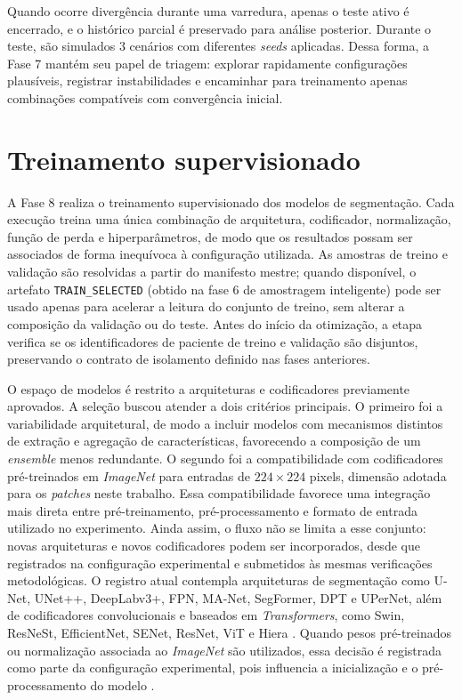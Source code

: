 Quando ocorre divergência durante uma varredura, apenas o teste ativo é encerrado, e o histórico parcial é preservado para análise posterior. Durante o teste, são simulados 3 cenários com diferentes \textit{seeds} aplicadas. Dessa forma, a Fase 7 mantém seu papel de triagem: explorar rapidamente configurações plausíveis, registrar instabilidades e encaminhar para treinamento apenas combinações compatíveis com convergência inicial.

\section{Treinamento supervisionado}\label{sec:met_treinamento}

A Fase 8 realiza o treinamento supervisionado dos modelos de segmentação. Cada
execução treina uma única combinação de arquitetura, codificador, normalização,
função de perda e hiperparâmetros, de modo que os resultados possam ser
associados de forma inequívoca à configuração utilizada. As amostras de treino e
validação são resolvidas a partir do manifesto mestre; quando disponível, o
artefato \texttt{TRAIN\_SELECTED} (obtido na fase 6 de amostragem inteligente)  pode ser usado apenas para acelerar a leitura
do conjunto de treino, sem alterar a composição da validação ou do teste. Antes
do início da otimização, a etapa verifica se os identificadores de paciente de
treino e validação são disjuntos, preservando o contrato de isolamento definido
nas fases anteriores.

O espaço de modelos é restrito a arquiteturas e codificadores previamente
aprovados. A seleção buscou atender a dois critérios principais. O primeiro foi
a variabilidade arquitetural, de modo a incluir modelos com mecanismos distintos
de extração e agregação de características, favorecendo a composição de um
\textit{ensemble} menos redundante. O segundo foi a compatibilidade com
codificadores pré-treinados em \textit{ImageNet} para entradas de $224 \times 224$
pixels, dimensão adotada para os \textit{patches} neste trabalho. Essa
compatibilidade favorece uma integração mais direta entre pré-treinamento,
pré-processamento e formato de entrada utilizado no experimento. Ainda assim, o
fluxo não se limita a esse conjunto: novas arquiteturas e novos codificadores
podem ser incorporados, desde que registrados na configuração experimental e
submetidos às mesmas verificações metodológicas. O registro atual contempla
arquiteturas de segmentação como U-Net, UNet++, DeepLabv3+, FPN, MA-Net,
SegFormer, DPT e UPerNet, além de codificadores convolucionais e baseados em
\textit{Transformers}, como Swin, ResNeSt, EfficientNet, SENet, ResNet, ViT e
Hiera
\cite{ronneberger2015unet,zhou2020unetpp,chen2018deeplabv3plus,lin2017fpn,
fan2020manet,xie2021segformer,ranftl2021dpt,xiao2018upernet,liu2021swin,
zhang2022resnest,tan2019efficientnet,hu2018senet,he2016resnet,
dosovitskiy2021vit,ryali2023hiera}. Quando pesos pré-treinados ou normalização
associada ao \textit{ImageNet} são utilizados, essa decisão é registrada como parte da
configuração experimental, pois influencia a inicialização e o pré-processamento
do modelo \cite{russakovsky2015imagenet}.

